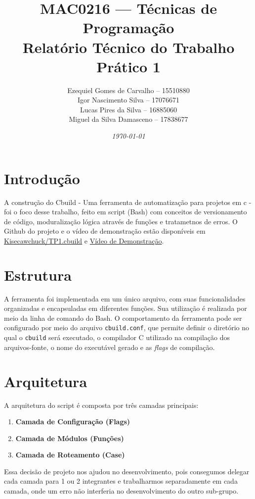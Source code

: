 \documentclass[a4paper]{article}
\title{MAC0216 --- Técnicas de Programação\\Relatório Técnico do Trabalho Prático 1}
\author{
    Ezequiel Gomes de Carvalho -- 15510880 \\
    Igor Nascimento Silva -- 17076671 \\
    Lucas Pires da Silva -- 16885060 \\
    Miguel da Silva Damasceno -- 17838677
}
\date{\textit{\small{\today}}}
\begin{document}
\maketitle

\section{Introdução}
A construção do Cbuild - Uma ferramenta de automatização para projetos em c - foi o foco desse trabalho, feito em script (Bash) com conceitos de versionamento de código, moduralização lógica através de funções e tratametnos de erros. O Github do projeto e o vídeo de demonstração estão disponíveis em \href{https://github.com/Kisecawchuck/TP1.cbuild}{Kisecawchuck/TP1.cbuild} e \href{https://drive.google.com/file/d/1fmye1a4HEJhPrriKJLhj_LTTRpnZDLWe/view?usp=drivesdk}{Vídeo de Demonstração}.

\section{Estrutura}

A ferramenta foi implementada em um único arquivo, com suas funcionalidades organizadas e encapsuladas em diferentes funções. Sua utilização é realizada por meio da linha de comando do Bash. O comportamento da ferramenta pode ser configurado por meio do arquivo \texttt{cbuild.conf}, que permite definir o diretório no qual o \texttt{cbuild} será executado, o compilador C utilizado na compilação dos arquivos-fonte, o nome do executável gerado e as \textit{flags} de compilação.

\section{Arquitetura}
A arquitetura do script é composta por três camadas principais:
\begin{enumerate}
    \item \textbf{Camada de Configuração (Flags)}
    \item \textbf{Camada de Módulos (Funções)}
    \item \textbf{Camada de Roteamento (Case)}
\end{enumerate}

Essa decisão de projeto nos ajudou no desenvolvimento, pois consegumos delegar cada camada para 1 ou 2 integrantes e trabalharmos separadamente em cada camada, onde um erro não interferia no desenvolvimento do outro sub-grupo.
\end{document}
